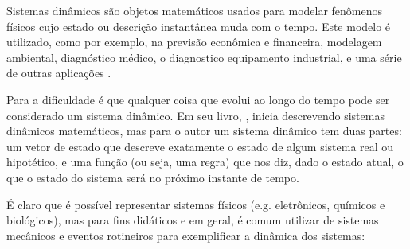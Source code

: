 Sistemas dinâmicos são objetos matemáticos usados para modelar fenômenos físicos cujo estado ou descrição instantânea muda com o tempo. Este modelo é utilizado, como por exemplo, na previsão econômica e financeira, modelagem ambiental, diagnóstico médico, o diagnostico equipamento industrial, e uma série de outras aplicações \cite{Dean1991}.

Para  a dificuldade é que qualquer coisa que evolui ao longo do tempo pode ser considerado um sistema dinâmico. Em seu livro, , inicia descrevendo sistemas dinâmicos matemáticos, mas para o autor um sistema dinâmico tem duas partes: um vetor de estado que descreve exatamente o estado de algum sistema real ou hipotético, e uma função (ou seja, uma regra) que nos diz, dado o estado atual, o que o estado do sistema será no próximo instante de tempo.

É claro que é possível representar sistemas físicos (e.g. eletrônicos, químicos e biológicos), mas para fins didáticos e em geral, é comum utilizar de sistemas mecânicos e eventos rotineiros para exemplificar a dinâmica dos sistemas:

